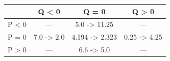 \begin{tabular}{l|ccc}
\toprule
 & Q \textless{} 0 & Q = 0 & Q \textgreater{} 0 \\
\midrule
P \textless{} 0 & --- & 5.0 -\textgreater{} 11.25 & --- \\
P = 0 & 7.0 -\textgreater{} 2.0 & 4.194 -\textgreater{} 2.323 & 0.25 -\textgreater{} 4.25 \\
P \textgreater{} 0 & --- & 6.6 -\textgreater{} 5.0 & --- \\
\bottomrule
\end{tabular}
